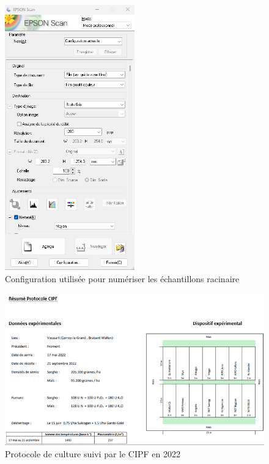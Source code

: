 \label{an:config}
\begin{figure}[ht]
\centering
\includegraphics[width=0.5\textwidth]{Image/config scanner.png}
\caption{Configuration utilisée pour numériser les échantillons racinaire}
\end{figure}

\newpage

\label{an:protocole_CIPF}
\begin{figure}[ht]
\centering
\includegraphics[width=1\textwidth]{Image/protocole CIPF.png}
\caption{Protocole de culture suivi par le CIPF en 2022 \citep{cipf_resultats_2022}}
\end{figure}

